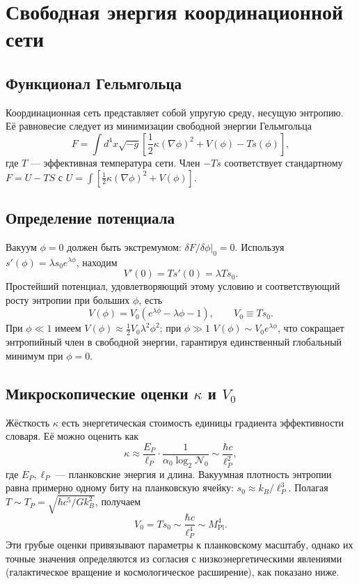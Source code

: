 \documentclass[12pt,a4paper]{article}
\begin{document}
	\section{Свободная энергия координационной сети}
	
	\subsection{Функционал Гельмгольца}
	Координационная сеть представляет собой упругую среду, несущую энтропию. Её равновесие следует из минимизации свободной энергии Гельмгольца
	\begin{equation}
		F = \int d^4x \sqrt{-g} \left[ \frac{1}{2}\kappa (\nabla\phi)^2 + V(\phi) - T s(\phi) \right],
		\label{eq:F}
	\end{equation}
	где \(T\) — эффективная температура сети. Член \(-Ts\) соответствует стандартному \(F = U - TS\) с \(U = \int [\frac12\kappa(\nabla\phi)^2 + V(\phi)]\).
	
	\subsection{Определение потенциала}
	Вакуум \(\phi=0\) должен быть экстремумом: \(\delta F/\delta\phi|_0 = 0\). Используя \(s'(\phi) = \lambda s_0 e^{\lambda\phi}\), находим
	\[
	V'(0) = T s'(0) = \lambda T s_0.
	\]
	Простейший потенциал, удовлетворяющий этому условию и соответствующий росту энтропии при больших \(\phi\), есть
	\begin{equation}
		\boxed{V(\phi) = V_0 \left( e^{\lambda\phi} - \lambda\phi - 1 \right), \qquad V_0 \equiv T s_0.}
		\label{eq:V}
	\end{equation}
	При \(\phi \ll 1\) имеем \(V(\phi) \approx \frac12 V_0 \lambda^2 \phi^2\); при \(\phi \gg 1\) \(V(\phi) \sim V_0 e^{\lambda\phi}\), что сокращает энтропийный член в свободной энергии, гарантируя единственный глобальный минимум при \(\phi=0\).
	
	\subsection{Микроскопические оценки \(\kappa\) и \(V_0\)}
	Жёсткость \(\kappa\) есть энергетическая стоимость единицы градиента эффективности словаря. Её можно оценить как
	\[
	\kappa \approx \frac{E_P}{\ell_P} \cdot \frac{1}{\alpha_0 \log_2 \mathcal{N}_0} \sim \frac{\hbar c}{\ell_P^2},
	\]
	где \(E_P, \ell_P\) — планковские энергия и длина. Вакуумная плотность энтропии равна примерно одному биту на планковскую ячейку: \(s_0 \approx k_B / \ell_P^3\). Полагая \(T \sim T_P = \sqrt{\hbar c^5 / G k_B^2}\), получаем
	\[
	V_0 = T s_0 \sim \frac{\hbar c}{\ell_P^4} \sim M_{\mathrm{Pl}}^4.
	\]
	Эти грубые оценки привязывают параметры к планковскому масштабу, однако их точные значения определяются из согласия с низкоэнергетическими явлениями (галактическое вращение и космологическое расширение), как показано ниже.
	
\end{document}

